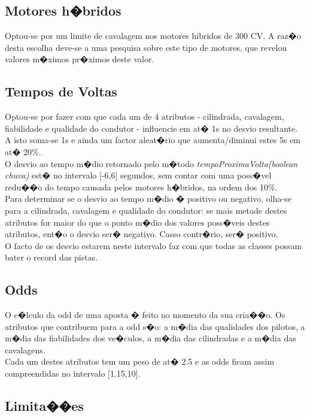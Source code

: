 ﻿\documentclass[10pt,notitlepage]{article}
\begin{document}
\subsection{Motores h�bridos}

Optou-se por um limite de cavalagem nos motores hibridos de 300 CV. A raz�o desta escolha deve-se a uma pesquisa sobre este tipo de motores, que revelou valores m�ximos pr�ximos deste valor.

\subsection{Tempos de Voltas}

Optou-se por fazer com que cada um de 4 atributos - cilindrada, cavalagem, fiabilidade e qualidade do condutor - influencie em at� 1s no desvio resultante. A isto soma-se 1s e ainda um factor aleat�rio que aumenta/diminui estes 5s em at� 20\%.\\

O desvio ao tempo m�dio retornado pelo m�todo \textit{tempoProximaVolta(boolean chuva)} est� no intervalo [-6,6] segundos, sem contar com uma poss�vel redu��o do tempo causada pelos motores h�bridos, na ordem dos 10\%.  \\

Para determinar se o desvio ao tempo m�dio � positivo ou negativo, olha-se para a cilindrada, cavalagem e qualidade do condutor: se mais metade destes atributos for maior do que o ponto m�dio dos valores poss�veis destes atributos, ent�o o desvio ser� negativo. Casso contr�rio, ser� positivo. \\

O facto de os desvio estarem neste intervalo faz com que todas as classes possam bater o record das pistas.

\newpage

\subsection{Odds}

O c�lculo da odd de uma aposta � feito no momento da sua cria��o. Os atributos que contribuem para a odd s�o: a m�dia das qualidades dos pilotos, a m�dia das fiabilidades dos ve�culos, a m�dia das cilindradas e a m�dia das cavalagens. \\

Cada um destes atributos tem um peso de at� 2.5 e as odds ficam assim compreendidas no intervalo [1.15,10].

\subsection{Limita��es}
\end{document}
